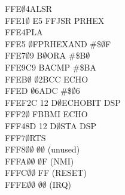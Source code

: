 \documentclass[letterpaper]{article}
\begin{document}
\begin{tabbing}
FFE$\emptyset$\>4A\>\>LSR\>\\
FFE1$\emptyset$ E5 FF\>\>JSR PRHEX\\
FFE4\>\>PLA\\
FFE5 $\emptyset$F\>PRHEX\>AND \#\$$\emptyset$F\\
FFE7\>$\emptyset$9 B$\emptyset$\>\>ORA \#\$B$\emptyset$\\
FFE9\>C9 BA\>\>CMP \#\$BA\\
FFEB$\emptyset$ $\emptyset$2\>\>BCC ECHO\\
FFED $\emptyset$6\>\>ADC \#\$$\emptyset$6\\
FFEF\>2C 12 D$\emptyset$\>ECHO\>BIT DSP\\
FFF2$\emptyset$ FB\>\>BMI ECHO\\
FFF4\>8D 12 D$\emptyset$\>\>STA DSP\\
FFF7$\emptyset$\>\>RTS\\
FFF8\>$\emptyset\emptyset$ $\emptyset\emptyset$ (unused)\\
FFFA\>$\emptyset\emptyset$ $\emptyset$F (NMI)\\
FFFC\>$\emptyset\emptyset$ FF (RESET)\\
FFFE\>$\emptyset\emptyset$ $\emptyset\emptyset$ (IRQ)\\
\end{tabbing}
\end{document}
